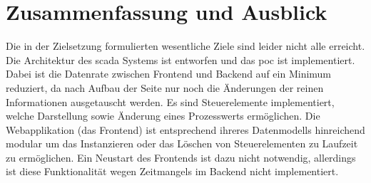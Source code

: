 \chapter{Zusammenfassung und Ausblick}\label{chapter:exit}
Die in der Zielsetzung formulierten wesentliche Ziele  sind leider nicht alle erreicht.
Die Architektur des \ac{scada} Systems ist entworfen und das \ac{poc} ist implementiert.
Dabei ist die Datenrate zwischen Frontend und Backend auf ein Minimum reduziert, 
da nach Aufbau der Seite nur noch die Änderungen der reinen Informationen ausgetauscht werden.
Es sind Steuerelemente implementiert, welche Darstellung sowie Änderung eines Prozesswerts ermöglichen.
Die Webapplikation (das Frontend) ist entsprechend ihreres Datenmodells hinreichend modular um das Instanzieren oder das Löschen von Steuerelementen zu Laufzeit zu ermöglichen.
Ein Neustart des Frontends ist dazu nicht notwendig, allerdings ist diese Funktionalität wegen Zeitmangels im Backend nicht implementiert.
 